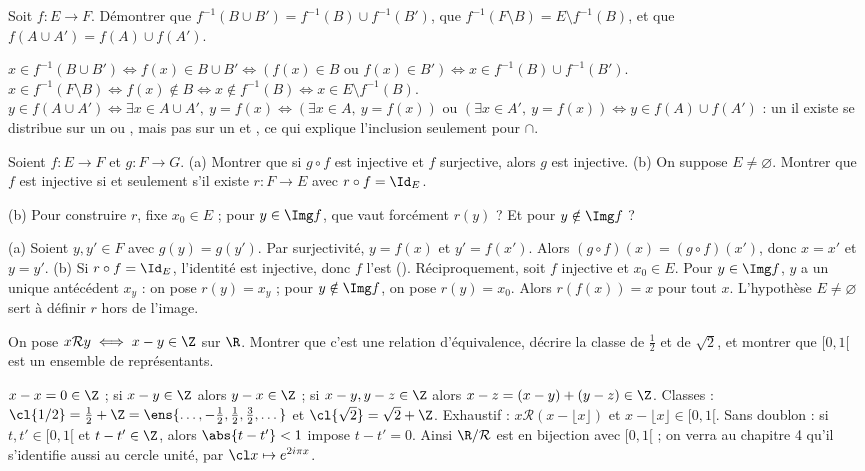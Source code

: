 \begin{exo}
Soit $f:E\to F$. Démontrer que $f^{-1}(B\cup B')=f^{-1}(B)\cup f^{-1}(B')$, que $f^{-1}(F\setminus B)=E\setminus f^{-1}(B)$, et que $f(A\cup A')=f(A)\cup f(A')$.
\begin{corrige}
$x\in f^{-1}(B\cup B')\iff f(x)\in B\cup B'\iff(f(x)\in B\text{ ou }f(x)\in B')\iff x\in f^{-1}(B)\cup f^{-1}(B')$.
$x\in f^{-1}(F\setminus B)\iff f(x)\notin B\iff x\notin f^{-1}(B)\iff x\in E\setminus f^{-1}(B)$.
$y\in f(A\cup A')\iff\exists x\in A\cup A',\ y=f(x)\iff(\exists x\in A,\ y=f(x))\text{ ou }(\exists x\in A',\ y=f(x))\iff y\in f(A)\cup f(A')$ : un \og il existe \fg{} se distribue sur un \og ou \fg, mais pas sur un \og et \fg, ce qui explique l'inclusion seulement pour $\cap$.
\end{corrige}
\end{exo}
\begin{exo}\label{exo-inverse-gauche}
Soient $f:E\to F$ et $g:F\to G$.
(a) Montrer que si $g\circ f$ est injective et $f$ surjective, alors $g$ est injective.
(b) On suppose $E\neq\varnothing$. Montrer que $f$ est injective si et seulement s'il existe $r:F\to E$ avec $r\circ f=\Id_E$.
\begin{indication}
(b) Pour construire $r$, fixe $x_0\in E$ ; pour $y\in\Img f$, que vaut forcément $r(y)$ ? Et pour $y\notin\Img f$ ?
\end{indication}
\begin{corrige}
(a) Soient $y,y'\in F$ avec $g(y)=g(y')$. Par surjectivité, $y=f(x)$ et $y'=f(x')$. Alors $(g\circ f)(x)=(g\circ f)(x')$, donc $x=x'$ et $y=y'$.
(b) Si $r\circ f=\Id_E$, l'identité est injective, donc $f$ l'est (). Réciproquement, soit $f$ injective et $x_0\in E$. Pour $y\in\Img f$, $y$ a un unique antécédent $x_y$ : on pose $r(y)=x_y$ ; pour $y\notin\Img f$, on pose $r(y)=x_0$. Alors $r(f(x))=x$ pour tout $x$. L'hypothèse $E\neq\varnothing$ sert à définir $r$ hors de l'image.
\end{corrige}
\end{exo}
\begin{exo}
On pose $x\mathcal R y\iff x-y\in\Z$ sur $\R$. Montrer que c'est une relation d'équivalence, décrire la classe de $\frac12$ et de $\sqrt2$, et montrer que $[0,1[$ est un ensemble de représentants.
\begin{corrige}
$x-x=0\in\Z$ ; si $x-y\in\Z$ alors $y-x\in\Z$ ; si $x-y,y-z\in\Z$ alors $x-z=(x-y)+(y-z)\in\Z$. Classes : $\cl{1/2}=\frac12+\Z=\ens{\dots,-\frac12,\frac12,\frac32,\dots}$ et $\cl{\sqrt2}=\sqrt2+\Z$. Exhaustif : $x\mathcal R(x-\lfloor x\rfloor)$ et $x-\lfloor x\rfloor\in[0,1[$. Sans doublon : si $t,t'\in[0,1[$ et $t-t'\in\Z$, alors $\abs{t-t'}<1$ impose $t-t'=0$. Ainsi $\R/\mathcal R$ est en bijection avec $[0,1[$ ; on verra au chapitre 4 qu'il s'identifie aussi au cercle unité, par $\cl x\mapsto e^{2i\pi x}$.
\end{corrige}
\end{exo}
